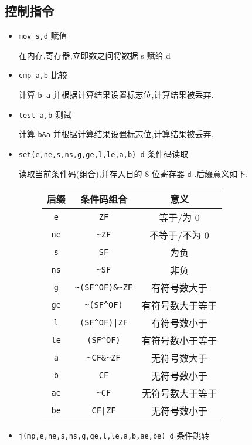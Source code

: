         \subsection{控制指令}
        \begin{itemize}
            \item \texttt{mov   s,d} 赋值

                在内存,寄存器,立即数之间将数据 s 赋给 d
            \item \texttt{cmp   a,b} 比较

                计算 \texttt{b-a} 并根据计算结果设置标志位,计算结果被丢弃.
            \item \texttt{test  a,b} 测试

                计算 \texttt{b\&a} 并根据计算结果设置标志位,计算结果被丢弃.
            \item \texttt{set(e,ne,s,ns,g,ge,l,le,a,b)   d} 条件码读取

                读取当前条件码(组合),并存入目的 8 位寄存器 \texttt{d} .后缀意义如下:
                \begin{figure}[htbp]
                    \centering
                    \label{tabular:control suffix}
                    \begin{tabular}{c||c|c}
                        后缀 & 条件码组合 & 意义\\\hline\hline
                        \texttt{e} & \texttt{ZF} & 等于/为 0\\\hline
                        \texttt{ne} & \texttt{\~{}ZF} & 不等于/不为 0\\\hline
                        \texttt{s} & \texttt{SF} & 为负\\\hline
                        \texttt{ns} & \texttt{\~{}SF} & 非负\\\hline
                        \texttt{g} & \texttt{\~{}(SF\^{}OF)\&\~{}ZF} & 有符号数大于\\\hline
                        \texttt{ge} & \texttt{\~{}(SF\^{}OF)} & 有符号数大于等于\\\hline
                        \texttt{l} & \texttt{(SF\^{}OF)|ZF} & 有符号数小于\\\hline
                        \texttt{le} & \texttt{(SF\^{}OF)} & 有符号数小于等于\\\hline
                        \texttt{a} & \texttt{\~{}CF\&\~{}ZF} & 无符号数大于\\\hline
                        \texttt{b} & \texttt{CF} & 无符号数小于\\\hline
                        \texttt{ae} & \texttt{\~{}CF} & 无符号数大于等于\\\hline
                        \texttt{be} & \texttt{CF|ZF} & 无符号数小于
                    \end{tabular}
                \end{figure}
            \item \texttt{j(mp,e,ne,s,ns,g,ge,l,le,a,b,ae,be)   d} 条件跳转


\end{itemize}
